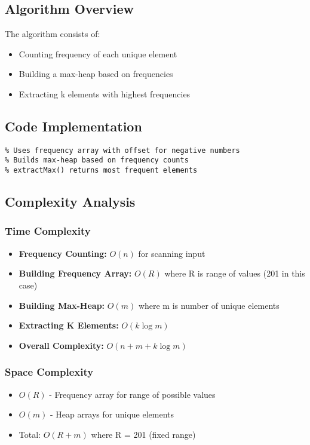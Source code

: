 \documentclass[12pt]{article}
\begin{document}
\subsection{Algorithm Overview}
The algorithm consists of:
\begin{itemize}
    \item Counting frequency of each unique element
    \item Building a max-heap based on frequencies
    \item Extracting k elements with highest frequencies
\end{itemize}

\subsection{Code Implementation}
\begin{lstlisting}[caption={K Most Frequent Elements - most_recurring.cpp}]
% CODE TO BE INSERTED HERE
% Uses frequency array with offset for negative numbers
% Builds max-heap based on frequency counts
% extractMax() returns most frequent elements
\end{lstlisting}

\subsection{Complexity Analysis}
\subsubsection{Time Complexity}
\begin{itemize}
    \item \textbf{Frequency Counting:} $O(n)$ for scanning input
    \item \textbf{Building Frequency Array:} $O(R)$ where R is range of values (201 in this case)
    \item \textbf{Building Max-Heap:} $O(m)$ where m is number of unique elements
    \item \textbf{Extracting K Elements:} $O(k \log m)$
    \item \textbf{Overall Complexity:} $O(n + m + k \log m)$
\end{itemize}

\subsubsection{Space Complexity}
\begin{itemize}
    \item $O(R)$ - Frequency array for range of possible values
    \item $O(m)$ - Heap arrays for unique elements
    \item Total: $O(R + m)$ where R = 201 (fixed range)
\end{itemize}
\end{document}
